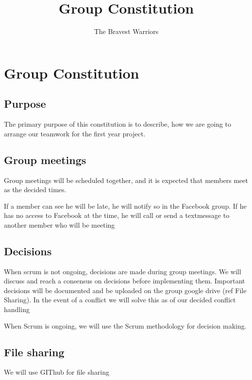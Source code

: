\documentclass[]{report}
\title{Group Constitution}
\author{The Bravest Warriors}
\begin{document}
\maketitle


\chapter{Group Constitution}

\section{Purpose}
The primary purpose of this constitution is to describe, how we are going to arrange our teamwork for the first year project.

\section{Group meetings}
Group meetings will be scheduled together, and it is expected that members meet as the decided times.

If a member can see he will be late, he will notify so in the Facebook group. If he has no access to Facebook at the time, he will call or send a textmessage to another member who will be meeting

\section{Decisions}
When scrum is not ongoing, decisions are made during group meetings. We will discuss and reach a consensus on decisions before implementing them. Important decisions will be documented and be uploaded on the group google drive (ref File Sharing). In the event of a conflict we will solve this as of our decided conflict handling


When Scrum is ongoing, we will use the Scrum methodology for decision making.


\section{File sharing}
We will use GIThub for file sharing
\end{document}
